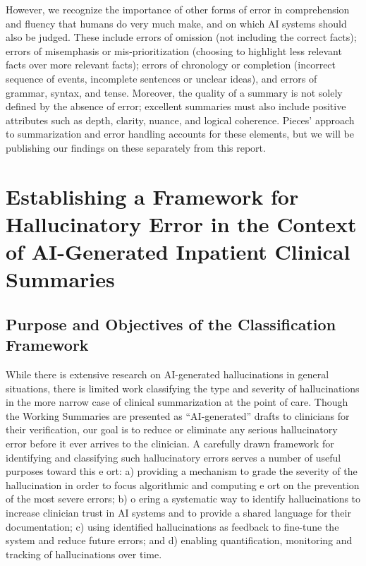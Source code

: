 \documentclass{style/myclass}
\begin{document}
However, we recognize the importance of other forms of error in comprehension and fluency that humans do very much make, and on which AI systems should also be judged. These include errors of omission (not including the correct facts); errors of misemphasis or mis-prioritization (choosing to highlight less relevant facts over more relevant facts); errors of chronology or completion (incorrect sequence of events, incomplete sentences or unclear ideas), and errors of grammar, syntax, and tense. Moreover, the quality of a summary is not solely defined by the absence of error; excellent summaries must also include positive attributes such as depth, clarity, nuance, and logical coherence. Pieces’ approach to summarization and error handling accounts for these elements, but we will be publishing our findings on these separately from this report.

\section{Establishing a Framework for Hallucinatory Error in the Context of AI-Generated Inpatient Clinical Summaries}

\subsection{Purpose and Objectives of the Classification Framework}

While there is extensive research on AI-generated hallucinations in general situations, \cite{5,6,7} there is limited work classifying the type and severity of hallucinations in the more narrow case of clinical summarization at the point of care. Though the Working Summaries are presented as “AI-generated” drafts to clinicians for their verification, our goal is to reduce or eliminate any serious hallucinatory error before it ever arrives to the clinician. A carefully drawn framework for identifying and classifying such hallucinatory errors serves a number of useful purposes toward this e ort: a) providing a mechanism to grade the severity of the hallucination in order to focus algorithmic and computing e ort on the prevention of the most severe errors; b) o ering a systematic way to identify hallucinations to increase clinician trust in AI systems and to provide a shared language for their documentation; c) using identified hallucinations as feedback to fine-tune the system and reduce future errors; and d) enabling quantification, monitoring and tracking of hallucinations over time.
\end{document}
